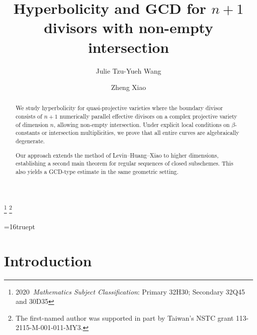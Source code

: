 \documentclass[10pt]{amsart}
\numberwithin{equation}{section}
\theoremstyle{plain}
\theoremstyle{definition}
\begin{document}
\title{ Hyperbolicity and GCD for $n+1$  divisors with non-empty intersection}
 
\author{Julie Tzu-Yueh Wang}
\address{Institute of Mathematics, Academia Sinica \newline
\indent No.\ 1, Sec.\ 4, Roosevelt Road\newline
\indent Taipei 10617, Taiwan}

\author{Zheng Xiao}
\address{Department of Mathematics, University of Colorado, Boulder
  \newline
{} Colorado Avenue \newline
\indent  Boulder, CO 80309 USA} 

\thanks{2020\ {\it Mathematics Subject Classification}: Primary 32H30; Secondary 32Q45 and 30D35}
\thanks{The  first-named author was supported in part by Taiwan's NSTC grant  113-2115-M-001-011-MY3.}


 

\begin{abstract} 
We study hyperbolicity  for quasi-projective varieties where the boundary divisor consists of $n+1$ numerically parallel effective divisors on a complex projective variety of dimension 
$n$, allowing non-empty intersection. Under explicit local conditions on 
$\beta$-constants or intersection multiplicities, we prove that all entire curves are algebraically degenerate.

Our approach extends the method of Levin–Huang–Xiao \cite{HLX} to higher dimensions, establishing a second main theorem for regular sequences of closed subschemes.  This also yields a GCD-type estimate in the same geometric setting.
\end{abstract}

\maketitle
\baselineskip=16truept

 \section{Introduction}\label{sec:intro}
\end{document}
